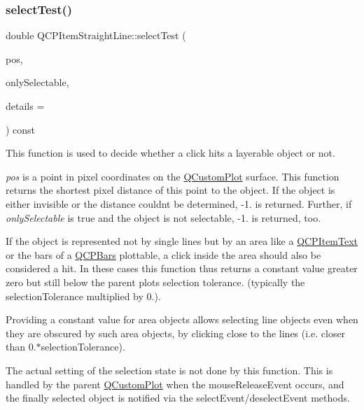 \subsubsection{\texorpdfstring{select\+Test()}{selectTest()}}
{\footnotesize\ttfamily double Q\+C\+P\+Item\+Straight\+Line\+::select\+Test (\begin{DoxyParamCaption}\item[{const Q\+PointF \&}]{pos,  }\item[{bool}]{only\+Selectable,  }\item[{Q\+Variant $\ast$}]{details = {} }\end{DoxyParamCaption}) const\hspace{0.3cm}{\ttfamily [virtual]}}

This function is used to decide whether a click hits a layerable object or not.

{\itshape pos} is a point in pixel coordinates on the \hyperlink{class_q_custom_plot}{Q\+Custom\+Plot} surface. This function returns the shortest pixel distance of this point to the object. If the object is either invisible or the distance couldn\textquotesingle{}t be determined, -\/1. is returned. Further, if {\itshape only\+Selectable} is true and the object is not selectable, -\/1. is returned, too.

If the object is represented not by single lines but by an area like a \hyperlink{class_q_c_p_item_text}{Q\+C\+P\+Item\+Text} or the bars of a \hyperlink{class_q_c_p_bars}{Q\+C\+P\+Bars} plottable, a click inside the area should also be considered a hit. In these cases this function thus returns a constant value greater zero but still below the parent plot\textquotesingle{}s selection tolerance. (typically the selection\+Tolerance multiplied by 0.).

Providing a constant value for area objects allows selecting line objects even when they are obscured by such area objects, by clicking close to the lines (i.\+e. closer than 0.$\ast$selection\+Tolerance).

The actual setting of the selection state is not done by this function. This is handled by the parent \hyperlink{class_q_custom_plot}{Q\+Custom\+Plot} when the mouse\+Release\+Event occurs, and the finally selected object is notified via the select\+Event/deselect\+Event methods.

